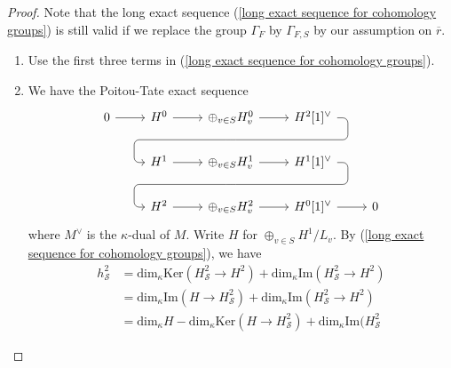 \documentclass[12pt,oneside,reqno]{amsart}
\theoremstyle{plain}
\begin{document}
	
	
	\begin{proof}
		Note that the long exact sequence
		(\ref{long exact sequence for cohomology groups})
		is still valid if we replace the group
		$\Gamma_F$
		by
		$\Gamma_{F,S}$
		by our assumption on
		$\overline{r}$.
		\begin{enumerate}
			\item 
			Use the first three terms in
			(\ref{long exact sequence for cohomology groups}).
			
			
			\item 
			We have the Poitou-Tate exact sequence
			\[
			\begin{tikzcd}
				0
				\arrow[r]
				&
				H^0
				\arrow[r]
				&
				\oplus_{v\in S}
				H^0_v
				\arrow[r]
				\arrow[d, phantom, ""{coordinate, name=Z}]
				&
				H^2[1]^\vee
				\arrow[lld, rounded corners, to path={ -- ([xshift=2ex]\tikztostart.east) |- (Z) [near end]\tikztonodes			
					-| ([xshift=-2ex]\tikztotarget.west)			
					-- (\tikztotarget)}]
				&
				\\
				&
				H^1
				\arrow[r]
				&
				\oplus_{v\in S}
				H^1_v
				\arrow[r]
				\arrow[d, phantom, ""{coordinate, name=Z}]
				&
				H^1[1]^\vee
				\arrow[lld, rounded corners, to path={ -- ([xshift=2ex]\tikztostart.east) |- (Z) [near end]\tikztonodes			
					-| ([xshift=-2ex]\tikztotarget.west)			
					-- (\tikztotarget)}]
				&
				\\
				&
				H^2
				\arrow[r]
				&
				\oplus_{v\in S}
				H^2_v
				\arrow[r]
				&
				H^0[1]^\vee
				\arrow[r]
				&
				0
			\end{tikzcd}
			\]
			where $M^\vee$ is the $\kappa$-dual of $M$.
			Write
			$H$ for
			$\oplus_{v\in S} H^1/L_v$.
			By
			(\ref{long exact sequence for cohomology groups}),
			we have
			\begin{align*}
				h^2_{\mathcal{S}}
				&
				=
				\mathrm{dim}_\kappa
				\mathrm{Ker}
				(H^2_{\mathcal{S}}
				\rightarrow
				H^2)
				+
				\mathrm{dim}_\kappa
				\mathrm{Im}
				(H^2_{\mathcal{S}}
				\rightarrow
				H^2)
				\\
				&
				=
				\mathrm{dim}_\kappa
				\mathrm{Im}
				(
				H
				\rightarrow
				H^2_{\mathcal{S}}
				)
				+
				\mathrm{dim}_\kappa
				\mathrm{Im}
				(H^2_{\mathcal{S}}
				\rightarrow
				H^2)
				\\
				&
				=
				\mathrm{dim}_\kappa
				H
				-
				\mathrm{dim}_\kappa
				\mathrm{Ker}
				(
				H
				\rightarrow
				H^2_{\mathcal{S}}
				)
				+
				\mathrm{dim}_\kappa
				\mathrm{Im}(H^2_{\mathcal{S}}

\end{align*}
\end{enumerate}
\end{proof}
\end{document}
